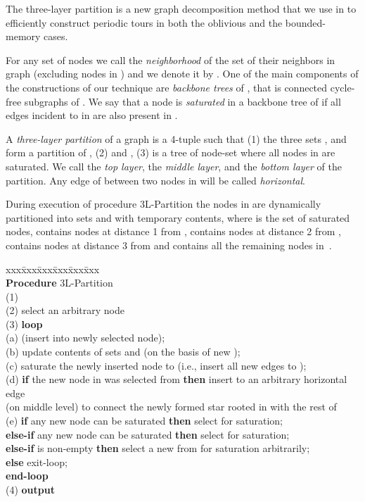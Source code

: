 \documentclass[11pt,envcountsame,oribibl]{llncs}
\begin{document}
The three-layer partition is a new graph decomposition method that we
use in to efficiently construct periodic tours in both the oblivious and
the bounded-memory cases.


For any set of nodes  we call the {\em neighborhood} of  the set
of their neighbors in graph  (excluding nodes in ) and we
denote it by .
One of the main components of the constructions of our technique
are {\em backbone trees} of , that is connected cycle-free subgraphs of .
We say that a node  is {\em saturated} in a backbone tree  of  if all
edges incident to  in  are also present in .

A {\em three-layer partition} of a graph  is a
4-tuple  such that
(1) the three sets ,  and  form a partition of ,
(2)  and ,
(3)  is a tree of node-set  where all nodes in  are saturated.
We call  the {\sl top layer},  the {\sl middle layer},
and  the {\sl bottom layer} of the partition. Any edge of 
between two nodes in  will be called {\sl horizontal}.

During execution of procedure {\sc 3L-Partition} the nodes in  are dynamically
partitioned into sets  and  with temporary contents, where  is the set of
saturated nodes,  contains nodes at distance 1 from ,
 contains
nodes at distance 2 from ,  contains nodes
at distance 3
from  and  contains all the remaining nodes in~.
\vspace*{-0.2cm}
\begin{tabbing}
xxx\=xxx\=xxx\=xxx\=xxx\=xxx\kill\\
{\bf Procedure} {\sc 3L-Partition}\\
(1) \>   \\
(2) \> select an arbitrary node \\
(3) \> {\bf loop}\\
\> (a)  (insert into  newly selected node);\\
\> (b) update contents of sets  and  (on the basis of new );\\
\> (c) saturate the newly inserted node  to  (i.e., insert
           all new edges to );\\
\> (d) {\bf if} the new node  in  was selected from  {\bf then}
           insert to  an arbitrary horizontal edge\\
\>\>\> (on middle level) to connect the newly formed star rooted
           in  with the rest of \\
\> (e) {\bf if} any new node  can be saturated {\bf then}
           select  for saturation;\\
\>\>\> {\bf else-if} any new node  can be saturated {\bf then}
           select  for saturation;\\
\>\>\>\> {\bf else-if}  is non-empty {\bf then} select a new 
           from  for saturation arbitrarily;\\
\>\>\>\>\> {\bf else} exit-loop;\\
\> {\bf end-loop}\\
(4) \> {\bf output} 
\end{tabbing}
\end{document}
